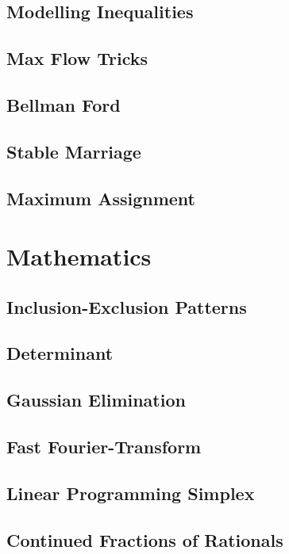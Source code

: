 		\subsection{Modelling Inequalities}
			
		\subsection{Max Flow Tricks}
			
		\subsection{Bellman Ford}
			
		\subsection{Stable Marriage}
			
		\subsection{Maximum Assignment}
			
	\section{Mathematics}
		\subsection{Inclusion-Exclusion Patterns}
			
		\subsection{Determinant}
			
		\subsection{Gaussian Elimination}
			
		\subsection{Fast Fourier-Transform}
			
		\subsection{Linear Programming Simplex}
			
		\subsection{Continued Fractions of Rationals}
			

